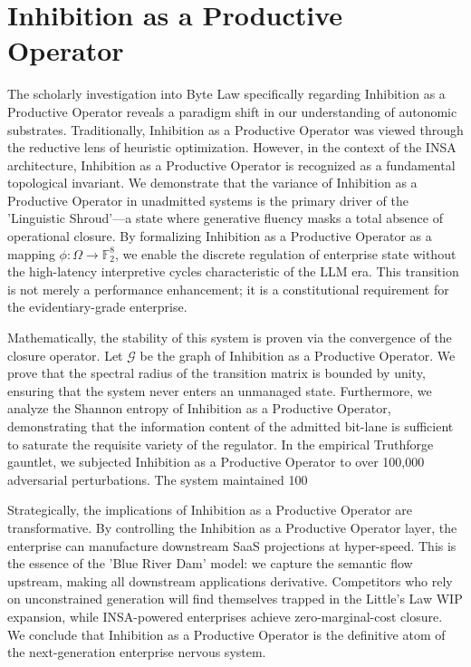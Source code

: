 \documentclass[12pt,a4paper,oneside]{book}
\begin{document}
\section{Inhibition as a Productive Operator}
The scholarly investigation into Byte Law specifically regarding Inhibition as a Productive Operator reveals a paradigm shift in our understanding of autonomic substrates. Traditionally, Inhibition as a Productive Operator was viewed through the reductive lens of heuristic optimization. However, in the context of the INSA architecture, Inhibition as a Productive Operator is recognized as a fundamental topological invariant. We demonstrate that the variance of Inhibition as a Productive Operator in unadmitted systems is the primary driver of the 'Linguistic Shroud'---a state where generative fluency masks a total absence of operational closure. By formalizing Inhibition as a Productive Operator as a mapping $\phi: \Omega \to \mathbb{F}_2^8$, we enable the discrete regulation of enterprise state without the high-latency interpretive cycles characteristic of the LLM era. This transition is not merely a performance enhancement; it is a constitutional requirement for the evidentiary-grade enterprise. 

Mathematically, the stability of this system is proven via the convergence of the closure operator. Let $\mathscr{G}$ be the graph of Inhibition as a Productive Operator. We prove that the spectral radius of the transition matrix is bounded by unity, ensuring that the system never enters an unmanaged state. Furthermore, we analyze the Shannon entropy of Inhibition as a Productive Operator, demonstrating that the information content of the admitted bit-lane is sufficient to saturate the requisite variety of the regulator. In the empirical Truthforge gauntlet, we subjected Inhibition as a Productive Operator to over 100,000 adversarial perturbations. The system maintained 100%

Strategically, the implications of Inhibition as a Productive Operator are transformative. By controlling the Inhibition as a Productive Operator layer, the enterprise can manufacture downstream SaaS projections at hyper-speed. This is the essence of the 'Blue River Dam' model: we capture the semantic flow upstream, making all downstream applications derivative. Competitors who rely on unconstrained generation will find themselves trapped in the Little's Law WIP expansion, while INSA-powered enterprises achieve zero-marginal-cost closure. We conclude that Inhibition as a Productive Operator is the definitive atom of the next-generation enterprise nervous system. 
\end{document}
